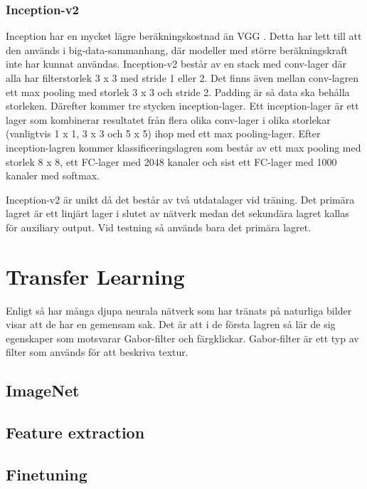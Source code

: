 \documentclass[]{kththesis}
\begin{document}
\subsubsection{Inception-v2}
Inception har en mycket lägre beräkningskostnad än VGG \parencite{szegedy2016rethinking}. Detta har lett till att den används i big-data-sammanhang, där modeller med större beräkningskraft inte har kunnat användas. Inception-v2 består av en stack med conv-lager där alla har filterstorlek 3 x 3 med stride 1 eller 2. Det finns även mellan conv-lagren ett max pooling med storlek 3 x 3 och stride 2. Padding är så data ska behålla storleken. Därefter kommer tre stycken inception-lager. Ett inception-lager är ett lager som kombinerar resultatet från flera olika conv-lager i olika storlekar (vanligtvis 1 x 1, 3 x 3 och 5 x 5) ihop med ett max pooling-lager. Efter inception-lagren kommer klassificeringslagren som består av ett max pooling med storlek 8 x 8, ett FC-lager med 2048 kanaler och sist ett FC-lager med 1000 kanaler med softmax.

Inception-v2 är unikt då det består av två utdatalager vid träning. \parencite{szegedy2016rethinking} Det primära lagret är ett linjärt lager i slutet av nätverk medan det sekundära lagret kallas för auxiliary output. Vid testning så används bara det primära lagret.

\section{Transfer Learning}
Enligt \cite{yosinski2014transferable} så har många djupa neurala nätverk som har tränats på naturliga bilder visar att de har en gemensam sak. Det är att i de första lagren så lär de sig egenskaper som motsvarar Gabor-filter och färgklickar. Gabor-filter är ett typ av filter som används för att beskriva textur. 


\subsection{ImageNet}

\subsection{Feature extraction}

\subsection{Finetuning}
\end{document}
